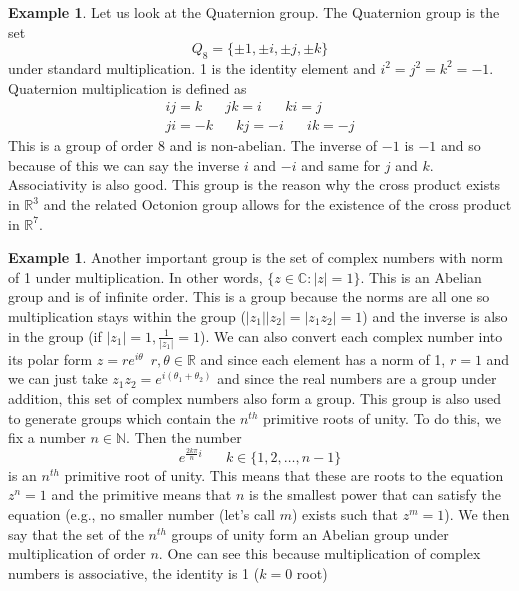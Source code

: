 \documentclass{article}
\newcommand{\R}{\mathbb{R}}
\newcommand{\N}{\mathbb{N}}
\newcommand{\C}{\mathbb{C}}
\newcommand{\twen}{\hspace{20pt}}
\theoremstyle{definition}
\newtheorem{example}[theorem]{Example}
\begin{document}
\begin{example}
    Let us look at the Quaternion group. The Quaternion group is the set 
\begin{equation*}
    Q_8 = \{ \pm 1, \pm i, \pm j, \pm k\}
\end{equation*}
under standard multiplication. 1 is the identity element and $i^2=j^2=k^2=-1$. Quaternion multiplication is defined as 
\begin{equation*}
    \begin{split}
        ij=k \twen jk =i \twen  ki=j \\
        ji=-k \twen kj=-i \twen ik=-j
    \end{split}
\end{equation*}
This is a group of order 8 and is non-abelian. The inverse of $-1$ is $-1$ and so because of this we can say the inverse $i$ and $-i$ and same for $j$ and $k$. Associativity is also good. This group is the reason why the cross product exists in $\R^3$ and the related Octonion group allows for the existence of the cross product in $\R^7$. 
\end{example}
\begin{example}
    Another important group is the set of complex numbers with norm of 1 under multiplication. In other words, $\{ z\in \C: |z|=1\}$. This is an Abelian group and is of infinite order. This is a group because the norms are all one so multiplication stays within the group ($|z_1||z_2|=|z_1z_2|=1$) and the inverse is also in the group (if $|z_1|=1, \frac{1}{|z_1|} =1$). We can also convert each complex number into its polar form $z=re^{i\theta}\,\,\, r,\theta \in \R$ and since each element has a norm of 1, $r=1$ and we can just take $z_1z_2=e^{i(\theta_1+\theta_2)}$ and since the real numbers are a group under addition, this set of complex numbers also form a group. This group is also used to generate groups which contain the $n^{th}$ primitive roots of unity. To do this, we fix a number $n\in \N$. Then the number 
    \begin{equation*}
        e^{\frac{2k\pi}{n}i} \twen k\in\{1,2,\ldots,n-1\}
    \end{equation*}
    is an $n^{th}$ primitive root of unity. This means that these are roots to the equation $z^n=1$ and the primitive means that $n$ is the smallest power that can satisfy the equation (e.g., no smaller number (let's call $m$) exists such that $z^m=1$). We then say that the set of the $n^{th}$ groups of unity form an Abelian group under multiplication of order $n$. One can see this because multiplication of complex numbers is associative, the identity is 1 ($k=0$ root) 
\end{example}
\end{document}
